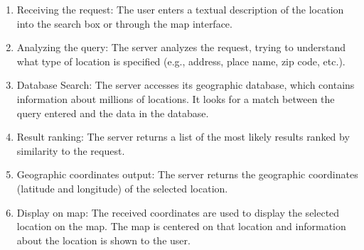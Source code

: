\documentclass[10pt,oneside,english,a4paper]{article}
\begin{document}
\begin{enumerate}
\item Receiving the request: The user enters a textual description of the location into the search box or through the map interface.
\item Analyzing the query: The server analyzes the request, trying to understand what type of location is specified (e.g., address, place name, zip code, etc.).
\item Database Search: The server accesses its geographic database, which contains information about millions of locations. It looks for a match between the query entered and the data in the database.
\item Result ranking: The server returns a list of the most likely results ranked by similarity to the request. 
\item Geographic coordinates output: The server returns the geographic coordinates (latitude and longitude) of the selected location.
\item Display on map: The received coordinates are used to display the selected location on the map. The map is centered on that location and information about the location is shown to the user.
\end{enumerate}
\end{document}
